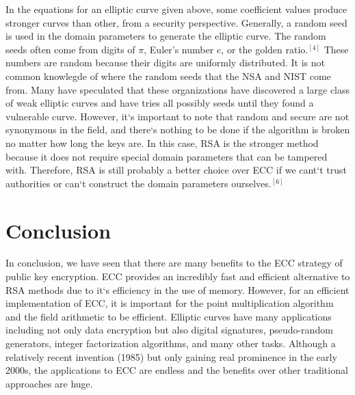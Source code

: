 \documentclass[conference]{IEEEtran}
\begin{document}
In the equations for an elliptic curve given above, some coefficient values produce stronger curves than other, from a security perspective.  Generally, a random seed is used in the domain parameters to generate the elliptic curve.  The random seeds often come from digits of $\pi$, Euler's number $e$, or the golden ratio.$^{[4]}$  These numbers are random because their digits are uniformly distributed.  It is not common knowlegde of where the random seeds that the NSA and NIST come from.  Many have speculated that these organizations have discovered a large class of weak elliptic curves and have tries all possibly seeds until they found a vulnerable curve.  However, it`s important to note that random and secure are not synonymous in the field, and there`s nothing to be done if the algorithm is broken no matter how long the keys are.  In this case, RSA is the stronger method because it does not require special domain parameters that can be tampered with.  Therefore, RSA is still probably a better choice over ECC if we cant`t trust authorities or can`t construct the domain parameters ourselves.$^{[6]}$  


\section{Conclusion}
In conclusion, we have seen that there are many benefits to the ECC strategy of public key encryption.  ECC provides an incredibly fast and efficient alternative to RSA methods due to it`s efficiency in the use of memory.  However, for an efficient implementation of ECC, it is important for the point multiplication algorithm and the field arithmetic to be efficient.  Elliptic curves have many applications including not only data encryption but also digital signatures, pseudo-random generators, integer factorization algorithms, and many other tasks.  Although a relatively recent invention (1985) but only gaining real prominence in the early 2000s, the applications to ECC are endless and the benefits over other traditional approaches are huge.  
\end{document}
